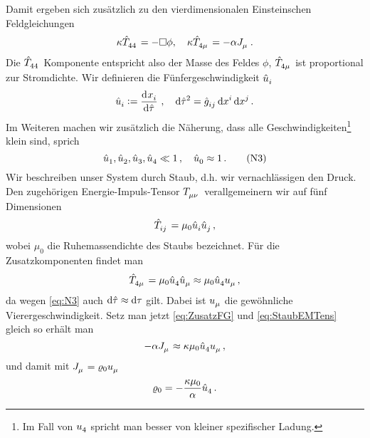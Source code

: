 Damit ergeben sich zusätzlich zu den vierdimensionalen Einsteinschen
Feldgleichungen
\begin{equation}
\kappa\tensor{\hat{T}}{_4_4}=-\square\phi, \quad
\kappa\tensor{\hat{T}}{_4_\mu}=-\alpha\tensor{J}{_\mu}\,.\label{eq:ZusatzFG}
\end{equation}
Die $\tensor{\hat{T}}{_4_4}$ Komponente entspricht also der Masse des Feldes
$\phi$, $\tensor{\hat{T}}{_4_\mu}$ ist proportional zur Stromdichte.
 Wir definieren die Fünfergeschwindigkeit $\tensor{\hat{u}}{_i}$
\begin{equation}
\tensor{\hat{u}}{_i}:=\dod{\tensor{x}{_i}}{\hat{\tau}}\,,
\quad\dif\hat{\tau}^2=\tensor{\hat{g}}{_i_j}\dif\tensor{x}{^i}\dif\tensor{x}{^j}\,.
\end{equation}
Im Weiteren machen wir zusätzlich die Näherung, dass alle
Geschwindigkeiten\footnote{Im Fall von $\tensor{u}{_4}$ spricht man
besser von kleiner spezifischer Ladung.} klein sind, sprich
\begin{equation}
\tensor{\hat{u}}{_1},\tensor{\hat{u}}{_2},\tensor{\hat{u}}{_3},\tensor{\hat{u}}{_4}\ll 1
\,,\quad\tensor{\hat{u}}{_0}\approx 1\, .\tag{N3}\label{eq:N3}
\end{equation}
Wir beschreiben unser System durch Staub, d.h. wir vernachlässigen den Druck. 
Den zugehörigen Energie-Impuls-Tensor $\tensor{T}{_\mu_\nu}$
verallgemeinern wir auf fünf Dimensionen
\begin{equation}
\tensor{\hat{T}}{_i_j}=\mu_0\tensor{\hat{u}}{_i}\tensor{\hat{u}}{_j}\, ,
\end{equation}
wobei $\mu_0$ die Ruhemassendichte des Staubs bezeichnet. Für die
Zusatzkomponenten findet man 
\begin{equation}
\tensor{\hat{T}}{_4_\mu}
=\mu_0\tensor{\hat{u}}{_4}\tensor{\hat{u}}{_\mu}\approx\mu_0\tensor{\hat{u}}{_4}\tensor{u}{_\mu}\,,
\label{eq:StaubEMTens}
\end{equation}
da wegen \eqref{eq:N3} auch $\dif\hat{\tau}\approx\dif\tau$ gilt.
Dabei ist $\tensor{u}{_\mu}$ die gewöhnliche Vierergeschwindigkeit.
Setz man jetzt \eqref{eq:ZusatzFG} und \eqref{eq:StaubEMTens} gleich so erhält
man
\begin{equation}
-\alpha\tensor{J}{_\mu}\approx\kappa\mu_0\tensor{\hat{u}}{_4}\tensor{u}{_\mu}
\,,
\end{equation}
und damit mit $\tensor{J}{_\mu}=\varrho_0\tensor{u}{_\mu}$
\begin{equation}
\varrho_0=-\frac{\kappa\mu_0}{\alpha}\tensor{\hat{u}}{_4}\,.\label{eq:murhorel}
\end{equation}

